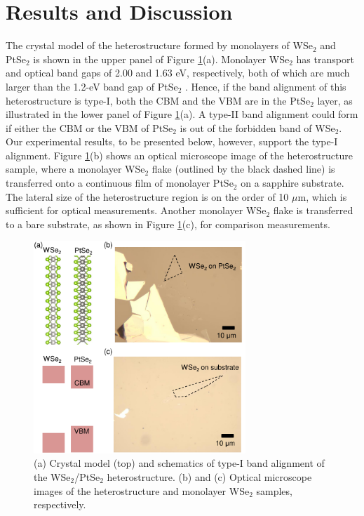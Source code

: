 \documentclass[10pt]{iopart}
\begin{document}
 \section{Results and Discussion} 
 The crystal model of the heterostructure formed by monolayers of WSe$_2$ and PtSe$_2$ is shown in the upper panel of Figure \ref{fig:sample}(a). Monolayer WSe$_2$ has transport and optical band gaps of 2.00 and 1.63 eV, respectively\cite{he2014tightly},  both of which are much larger than the 1.2-eV band gap of PtSe$_2$ \cite{zhao2017high,wang2015monolayer,guo2016biaxial,xie2019optical}. Hence, if the band alignment of this heterostructure is type-I, both the CBM and the VBM are in the PtSe$_2$ layer, as illustrated in the lower panel of Figure \ref{fig:sample}(a). A type-II band alignment could form if either the CBM or the VBM of PtSe$_2$ is out of the forbidden band of WSe$_2$. Our experimental results, to be presented below, however, support the type-I alignment. Figure \ref{fig:sample}(b) shows an optical microscope image of the heterostructure sample, where a monolayer WSe$_2$ flake (outlined by the black dashed line) is transferred onto a continuous film of monolayer PtSe$_2$ on a sapphire substrate. The lateral size of the heterostructure region is on the order of 10 $\mu$m, which is sufficient for optical measurements. Another monolayer WSe$_2$ flake is transferred to a bare substrate, as shown in Figure \ref{fig:sample}(c), for comparison measurements.

\begin{figure}[ht!]
  \centering
  \includegraphics[width=8cm]{sample.pdf}
  \caption{(a) Crystal model (top) and schematics of type-I band alignment of the WSe$_2$/PtSe$_2$ heterostructure. (b) and (c) Optical microscope images of the heterostructure and monolayer WSe$_2$ samples, respectively.}
    \label{fig:sample}
\end{figure}
\end{document}
